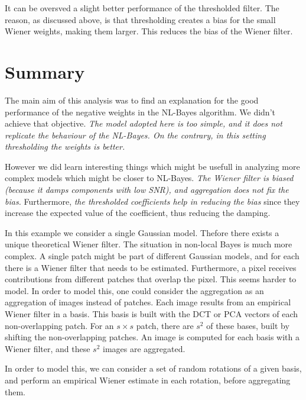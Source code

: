 \documentclass[a4paper,10pt]{article}
\begin{document}
It can be oversved a slight better performance of the thresholded filter. The reason,
as discussed above, is that thresholding creates a bias for the small Wiener
weights, making them larger. This reduces the bias of the Wiener filter.


\section{Summary}

The main aim of this analysis was to find an explanation for the good performance of 
the negative weights in the NL-Bayes algorithm. We didn't achieve that objective. 
\emph{The model adopted here is too simple, and it does not replicate the behaviour of the 
NL-Bayes. On the contrary, in this setting thresholding the weights is better.}

However we did learn interesting things which might be usefull in analyzing more
complex models which might be closer to NL-Bayes. \emph{The Wiener filter is biased
(because it damps components with low SNR), and aggregation does not fix the
bias.} Furthermore, \emph{the thresholded coefficients help in reducing the bias} since
they increase the expected value of the coefficient, thus reducing the damping. 

In this example we consider a single Gaussian model. Thefore there exists a
unique theoretical Wiener filter.
The situation in non-local Bayes is much more complex. 
A single patch might be part
of different Gaussian models, and for each there is a Wiener filter that needs
to be estimated. 
Furthermore, a pixel receives contributions from different patches that overlap the
pixel. This seems harder to model. In order to model this, one could consider 
the aggregation as an aggregation of images instead of patches. Each image results
from an empirical Wiener filter in a basis. This basis is built with the DCT or
PCA vectors of each non-overlapping patch. For an $s\times s$ patch, there are $s^2$
of these bases, built by shifting the non-overlapping patches. An image is computed
for each basis with a Wiener filter, and these $s^2$ images are aggregated.

In order to model this, we can consider a set of random rotations of a given basis,
and perform an empirical Wiener estimate in each rotation, before aggregating them. 
\end{document}
